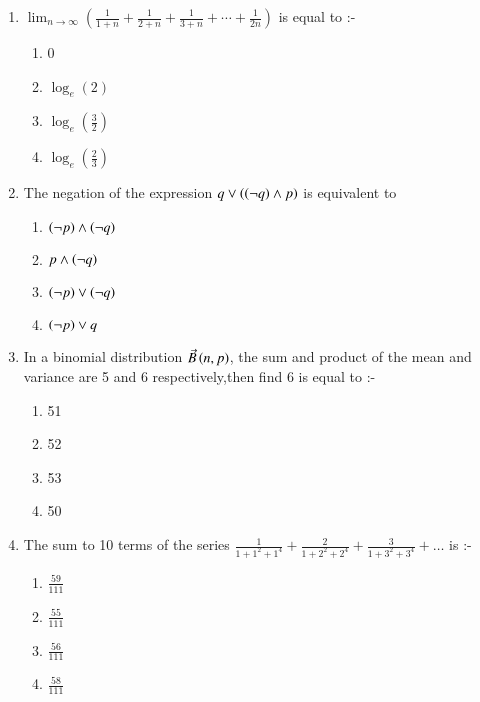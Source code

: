 \documentclass[journal]{IEEEtran}
\begin{document}
\begin{enumerate}
\item $\displaystyle \lim_{n \to \infty} \left( \frac{1}{1+n} + \frac{1}{2+n} + \frac{1}{3+n} + \cdots +\frac{1}{2n} \right )$ is equal to :-
\begin{multicols}{2}
\begin{enumerate}
    \item 0
    \item $\log_e(2)$
    \item $\log_e(\frac{3}{2})$
    \item $\log_e(\frac{2}{3})$
\end{enumerate}
\end{multicols}
\item The negation of the expression $q \vee \left(\left(\neg q\right)\wedge p\right)$ is equivalent to 
\begin{multicols}{2}
\begin{enumerate}
\item $\left(\neg p\right) \wedge \left(\neg q\right)$
\item $p \wedge \left(\neg q\right)$
\item $\left(\neg p\right) \vee \left(\neg q\right)$
\item $\left(\neg p\right) \vee q$
\end{enumerate}
\end{multicols}
\item In a binomial distribution $\Vec{B}\left(n,p\right)$, the sum and product of the mean and variance are 5 and 6 respectively,then find 6 is equal to :-
\begin{multicols}{2}
\begin{enumerate}
    \item 51
    \item 52
    \item 53
    \item 50
\end{enumerate}
\end{multicols}
\item The sum to 10 terms of the series $\frac{1}{1+1^2+1^4}+\frac{2}{1+2^2+2^4}+\frac{3}{1+3^2+3^4}+ \dots$ is :-
\begin{multicols}{2}
\begin{enumerate}
    \item $\frac{59}{111}$
    \item $\frac{55}{111}$
    \item $\frac{56}{111}$
    \item $\frac{58}{111}$
\end{enumerate}

\end{multicols}
\end{enumerate}
\end{document}
